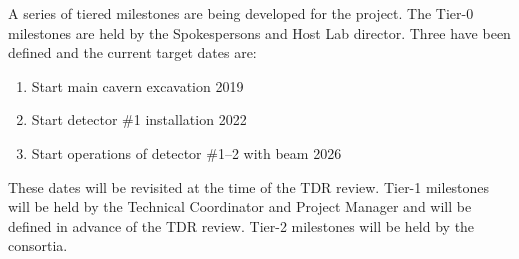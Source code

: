 A series of tiered milestones are being developed for the 
project. The Tier-0 milestones are held by the Spokespersons and Host
Lab director. Three have been defined and the current target dates
are:
\begin{enumerate}
\item Start main cavern excavation \hspace{2.1in} 2019
\item Start detector \#1 installation \hspace{2.1in} 2022
\item Start operations of detector \#1--2 with beam \hspace{1in} 2026
\end{enumerate}
These dates will be revisited at the time of the TDR review.  Tier-1
milestones will be held by the Technical Coordinator and  Project
Manager and will be defined in advance of the TDR review. Tier-2
milestones will be held by the consortia.

